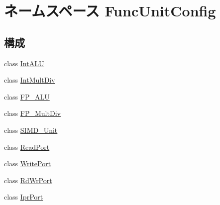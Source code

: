 \hypertarget{namespaceFuncUnitConfig}{
\section{ネームスペース FuncUnitConfig}
\label{namespaceFuncUnitConfig}
}
\subsection*{構成}
\begin{DoxyCompactItemize}
\item 
class \hyperlink{classFuncUnitConfig_1_1IntALU}{IntALU}
\item 
class \hyperlink{classFuncUnitConfig_1_1IntMultDiv}{IntMultDiv}
\item 
class \hyperlink{classFuncUnitConfig_1_1FP__ALU}{FP\_\-ALU}
\item 
class \hyperlink{classFuncUnitConfig_1_1FP__MultDiv}{FP\_\-MultDiv}
\item 
class \hyperlink{classFuncUnitConfig_1_1SIMD__Unit}{SIMD\_\-Unit}
\item 
class \hyperlink{classFuncUnitConfig_1_1ReadPort}{ReadPort}
\item 
class \hyperlink{classFuncUnitConfig_1_1WritePort}{WritePort}
\item 
class \hyperlink{classFuncUnitConfig_1_1RdWrPort}{RdWrPort}
\item 
class \hyperlink{classFuncUnitConfig_1_1IprPort}{IprPort}
\end{DoxyCompactItemize}
